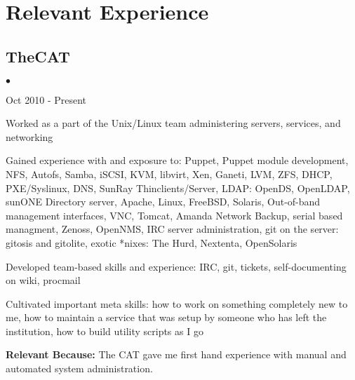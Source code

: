 \documentclass[10pt,letterpaper]{article}
\renewenvironment{itemize}{
  \begin{list}{}{
    \setlength{\leftmargin}{1.5em}
    \setlength{\itemsep}{0.25em}
    \setlength{\parskip}{0pt}
    \setlength{\parsep}{0.25em}
  }
}{
  \end{list}
}
\begin{document}
\renewenvironment{itemize}{
  \begin{list}{$\bullet$}{
    \setlength{\leftmargin}{1.5em}
    \setlength{\itemsep}{0.25em}
    \setlength{\parskip}{0pt}
    \setlength{\parsep}{0.25em}
  }
}{
  \end{list}
}
\section*{Relevant Experience}

\subsection*{TheCAT}
\begin{itemize}

    \item Oct 2010 - Present
    \item Worked as a part of the Unix/Linux team administering servers, services, and networking
    \item Gained experience with and exposure to: Puppet, Puppet module development, NFS, Autofs, Samba, iSCSI, KVM, libvirt, Xen, Ganeti, LVM, ZFS, DHCP, PXE/Syslinux, DNS, SunRay Thinclients/Server, LDAP: OpenDS, OpenLDAP, sunONE Directory server, Apache, Linux, FreeBSD, Solaris, Out-of-band management interfaces, VNC, Tomcat, Amanda Network Backup, serial based managment, Zenoss, OpenNMS, IRC server administration, git on the server: gitosis and gitolite, exotic *nixes: The Hurd, Nextenta, OpenSolaris
    \item Developed team-based skills and experience: IRC, git, tickets, self-documenting on wiki, procmail
    \item Cultivated important meta skills: how to work on something completely new to me, how to maintain a service that was setup by someone who has left the institution, how to build utility scripts as I go

    \item \textbf{Relevant Because:} The CAT gave me first hand experience with manual and automated system administration. 
 
\end{itemize}
\end{document}
